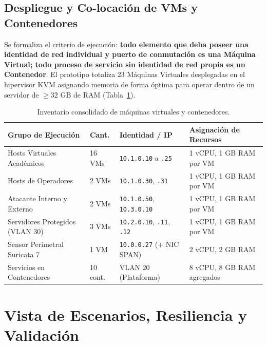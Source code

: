 \documentclass[11pt,a4paper]{report}
\begin{document}
\section{Despliegue y Co-locación de VMs y Contenedores}
Se formaliza el criterio de ejecución: \textbf{todo elemento que deba poseer una identidad de red individual y puerto de conmutación es una Máquina Virtual; todo proceso de servicio sin identidad de red propia es un Contenedor}.
El prototipo totaliza 23 Máquinas Virtuales desplegadas en el hipervisor KVM asignando memoria de forma óptima para operar dentro de un servidor de $\ge 32\text{ GB}$ de RAM (Tabla~\ref{tab:vms}).

\begin{table}[h!]
\centering
\small
\begin{tabularx}{\linewidth}{p{4.2cm}p{1.2cm}p{3.2cm}X}
\toprule
\textbf{Grupo de Ejecución} & \textbf{Cant.} & \textbf{Identidad / IP} & \textbf{Asignación de Recursos} \\
\midrule
Hosts Virtuales Académicos & 16 VMs & \texttt{10.1.0.10} a \texttt{.25} & 1 vCPU, 1 GB RAM por VM \\
Hosts de Operadores & 2 VMs & \texttt{10.1.0.30}, \texttt{.31} & 1 vCPU, 1 GB RAM por VM \\
Atacante Interno y Externo & 2 VMs & \texttt{10.1.0.50}, \texttt{10.3.0.10} & 1 vCPU, 1 GB RAM por VM \\
Servidores Protegidos (VLAN 30) & 3 VMs & \texttt{10.2.0.10}, \texttt{.11}, \texttt{.12} & 1 vCPU, 1 GB RAM por VM \\
Sensor Perimetral Suricata 7 & 1 VM & \texttt{10.0.0.27} (+ NIC SPAN) & 2 vCPU, 2 GB RAM \\
Servicios en Contenedores & 10 cont. & VLAN 20 (Plataforma) & 8 vCPU, 8 GB RAM agregados \\
\bottomrule
\end{tabularx}
\caption{Inventario consolidado de máquinas virtuales y contenedores.}
\label{tab:vms}
\end{table}

\chapter{Vista de Escenarios, Resiliencia y Validación}
\end{document}
